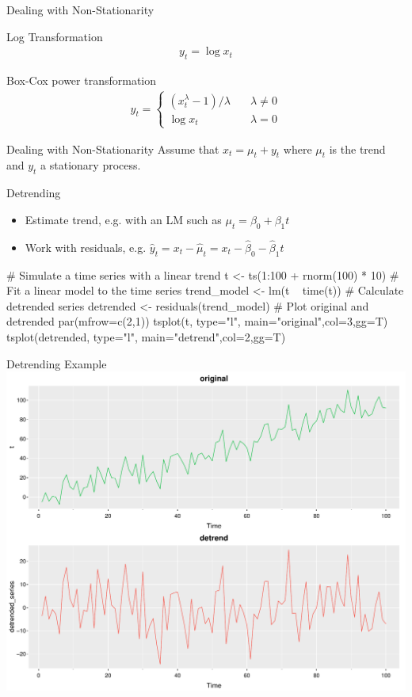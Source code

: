 \documentclass[ignorenonframetext,xcolor=x11names]{beamer}
\begin{document}
\begin{frame}{Dealing with Non-Stationarity}
\begin{block}{Log Transformation}
  \begin{align*}y_t = \log x_t\end{align*}
\end{block}
\begin{block}{Box-Cox power transformation}
  \begin{align*}y_t = \begin{cases}(x_t^\lambda-1)/\lambda &\quad \lambda\neq0 \\
  \log x_t &\quad \lambda=0
  \end{cases}
  \end{align*}
\end{block}
\end{frame}


\begin{frame}[fragile]{Dealing with Non-Stationarity}
Assume that $x_t = \mu_t + y_t$ where $\mu_t$ is the trend and $y_t$ a stationary process.
\begin{block}{Detrending}
\begin{itemize}
  \item Estimate trend, e.g. with an LM such as $\mu_t = \beta_0 + \beta_1 t$
  \item Work with residuals, e.g. $\hat y_t = x_t - \hat \mu_t = x_t - \hat\beta_0 - \hat\beta_1 t$
\end{itemize}
\end{block}
\begin{Rcode}
# Simulate a time series with a linear trend
t <- ts(1:100 + rnorm(100) * 10)
# Fit a linear model to the time series
trend_model <- lm(t ~ time(t))
# Calculate detrended series
detrended <- residuals(trend_model)
# Plot original and detrended
par(mfrow=c(2,1))
tsplot(t, type="l", main="original",col=3,gg=T)
tsplot(detrended, type="l", main="detrend",col=2,gg=T)
\end{Rcode}
\end{frame}

\begin{frame}{Detrending Example}
\centering
\includegraphics[width=.9\textwidth]{figure39a.pdf}
\end{frame}
\end{document}
